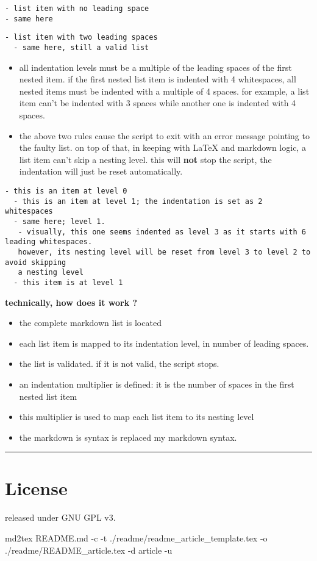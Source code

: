 \documentclass[a4paper, 12pt, twoside]{book}
\begin{document}
\begin{Verbatim}[breaklines=true]
- list item with no leading space
- same here
\end{Verbatim}

\begin{Verbatim}[breaklines=true]
  - list item with two leading spaces
  - same here, still a valid list
\end{Verbatim}

\begin{itemize}
\item all indentation levels must be a multiple of the leading spaces of the first nested item. if the first nested list item is indented with 4 whitespaces, all nested items must be indented with a multiple of 4 spaces. for example, a list item can't be indented with 3 spaces while another one is indented with 4 spaces. 
\end{itemize}

\begin{itemize}
\item the above two rules cause the script to exit with an error message pointing to the faulty list. on top of that, in keeping with LaTeX and markdown logic, a list item can't skip a nesting level. this will \textbf{not} stop the script, the indentation will just be reset automatically. 
\end{itemize}

\begin{Verbatim}[breaklines=true]
- this is an item at level 0
  - this is an item at level 1; the indentation is set as 2 whitespaces
  - same here; level 1.
   - visually, this one seems indented as level 3 as it starts with 6 leading whitespaces.
   however, its nesting level will be reset from level 3 to level 2 to avoid skipping
   a nesting level
  - this item is at level 1
\end{Verbatim}

\textbf{technically, how does it work ?}

\begin{itemize}
\item the complete markdown list is located
\item each list item is mapped to its indentation level, in number of leading spaces.
\item the list is validated. if it is not valid, the script stops.
\item an indentation multiplier is defined: it is the number of spaces in the first nested list item
\item this multiplier is used to map each list item to its nesting level
\item the markdown is syntax is replaced my markdown syntax. 
\end{itemize}

\par\noindent\rule{\linewidth}{0.4pt}
\section*{License}

released under GNU GPL v3.

md2tex README.md -c -t ./readme/readme\_article\_template.tex -o ./readme/README\_article.tex -d article -u


\clearpage
\tableofcontents
\end{document}
